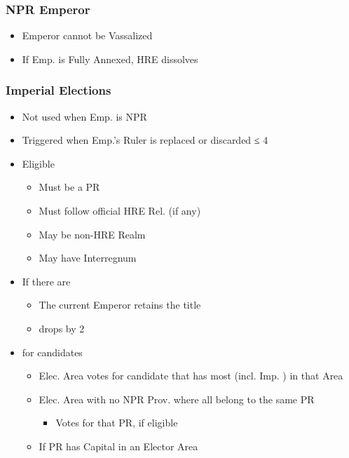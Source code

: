 \documentclass[10pt]{article}
\begin{document}
\subsubsection*{NPR Emperor }
\begin{itemize}
	\item Emperor cannot be Vassalized
	\item If Emp. is Fully Annexed, HRE dissolves
\end{itemize}

\subsubsection*{Imperial Elections }
\begin{itemize}
	\item Not used when Emp. is NPR 
	\item Triggered when Emp.'s Ruler is replaced or discarded  \authority ≤ 4
	\item Eligible 
	\begin{itemize}
		\item Must be a PR
		\item Must follow official HRE Rel. (if any)
		\item May be non-HRE Realm
		\item May have Interregnum
	\end{itemize}
	\item If there are 
	\begin{itemize}
		\item The current Emperor retains the title
		\item \authority drops by 2
	\end{itemize}
	\item {} for candidates
	\begin{itemize}
		\item Elec. Area votes for candidate that has most \influence (incl. Imp. \influence) in that Area
		\item Elec. Area with no NPR Prov. where all \vassals belong to the same PR
		\begin{itemize}
			\item Votes for that PR, if eligible
		\end{itemize}
		\item If PR has Capital in an Elector Area
		\begin{itemize}

\end{itemize}
\end{itemize}
\end{itemize}
\end{document}
